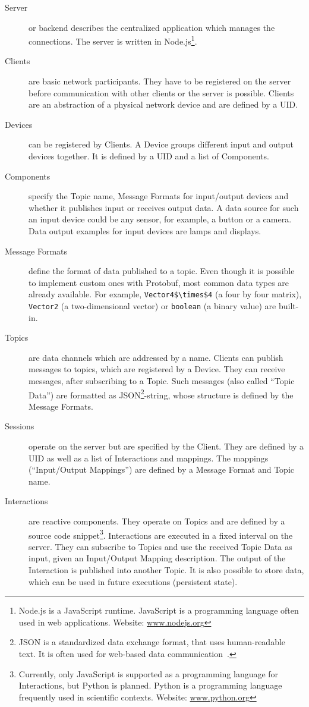 \begin{description}
  \item[Server] or backend describes the centralized application which manages the connections. The server is written in Node.js\footnote{Node.js is a JavaScript runtime. JavaScript is a programming language often used in web applications. Website: \href{https://nodejs.org/}{www.nodejs.org}}.
	\item[Clients] are basic network participants. They have to be registered on the server before communication with other clients or the server is possible. Clients are an abstraction of a physical network device and are defined by a \ac{UID}. 
	\item[Devices] can be registered by Clients. A Device groups different input and output devices together. It is defined by a \ac{UID} and a list of Components.
  \item[Components] specify the Topic name, Message Formats for input/output devices and whether it publishes input or receives output data. A data source for such an input device could be any sensor, for example, a button or a camera. Data output examples for input devices are lamps and displays.
  \item[Message Formats] define the format of data published to a topic. Even though it is possible to implement custom ones with \ac{Protobuf}, most common data types are already available. For example, \lstinline[mathescape=true]{Vector4$\times$4} (a four by four matrix), \lstinline{Vector2} (a two-dimensional vector) or \lstinline{boolean} (a binary value) are built-in. %
	\item[Topics] are data channels which are addressed by a name. Clients can publish messages to topics, which are registered by a Device. They can receive messages, after subscribing to a Topic. Such messages (also called \enquote{Topic Data}) are formatted as JSON\footnote{JSON is a standardized data exchange format, that uses human-readable text. It is often used for web-based data communication~\cite[iii]{ECMAInternational.2017}.}-string, whose structure is defined by the Message Formats.
	\item[Sessions] operate on the server but are specified by the Client. They are defined by a \ac{UID} as well as a list of Interactions and mappings. The mappings (\enquote{Input/Output Mappings}) are defined by a Message Format and Topic name.
	\item[Interactions] are reactive components. They operate on Topics and are defined by a source code snippet\footnote{Currently, only JavaScript is supported as a programming language for Interactions, but Python is planned. Python is a programming language frequently used in scientific contexts. Website: \href{https://www.python.org/}{www.python.org}}. Interactions are executed in a fixed interval on the server. They can subscribe to Topics and use the received Topic Data as input, given an Input/Output Mapping description. The output of the Interaction is published into another Topic. It is also possible to store data, which can be used in future executions (persistent state).

\end{description}
